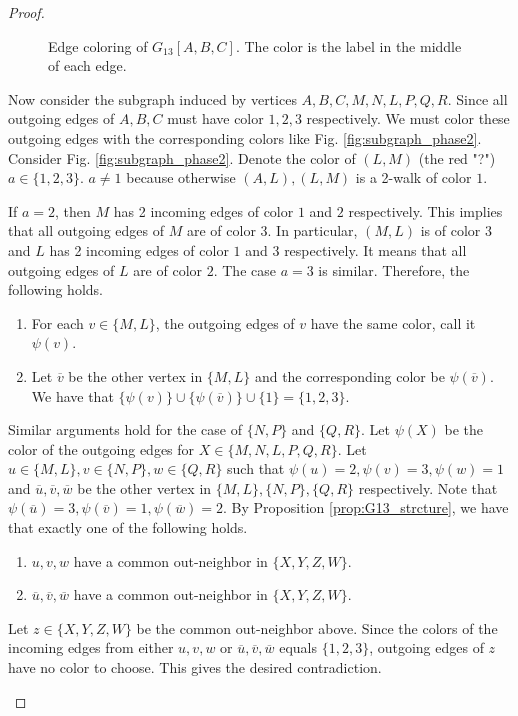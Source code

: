 \documentclass[journal, onecolumn, draftcls]{IEEEtran}
\theoremstyle{definition}
\newcommand{\aditya}[1]{\marginpar{+}{\bf Aditya's remark}: {\em #1}}
\begin{document}
\begin{proof}
\begin{figure}[t]
{
    }
    \caption{Edge coloring of $G_{13}[A,B,C]$. The color is the label in the middle of each edge.}
    \label{fig:coloring_ABC}
\end{figure} 
Now consider the subgraph induced by vertices $A,B,C,M,N,L,P,Q,R$. Since all outgoing edges of $A,B,C$ must have color $1,2,3$ respectively. We must color these outgoing edges with the corresponding colors like Fig. \ref{fig:subgraph_phase2}. Consider Fig. \ref{fig:subgraph_phase2}. Denote the color of  $(L,M)$ (the red "?") $a\in \{1,2,3\}$. $a\ne 1$ because otherwise $(A,L),(L,M)$ is a 2-walk of color $1$. 

If $a=2$, then $M$ has 2 incoming edges of color $1$ and $2$ respectively. This implies that all outgoing edges of $M$ are of color $3$. In particular, $(M,L)$ is of color $3$ and $L$ has 2 incoming edges of color $1$ and $3$ respectively. It means that all outgoing edges of $L$ are of color $2$. The case $a=3$ is similar. Therefore, the following holds. %
\begin{enumerate}
    \item For each $v\in \{M,L\}$, the outgoing edges of $v$ have the same color, call it $\psi(v)$.
    \item Let $\overline{v}$ be the other vertex in $\{M,L\}$ and the corresponding color be $\psi(\overline{v})$. We have that $\{\psi(v)\}\cup \{\psi(\overline{v})\}\cup\{1\}= \{1,2,3\}$.
\end{enumerate} 
Similar arguments hold for the case of $\{N,P\}$ and $\{Q,R\}$. Let $\psi(X)$ be the color of the outgoing edges for $X\in \{M,N,L,P,Q,R\}$.  Let $u\in \{M,L\},v\in\{N,P\},w\in\{Q,R\}$ such that $\psi(u) = 2, \psi(v)=3,\psi(w)=1$ and $\overline{u},\overline{v},\overline{w}$ be the other vertex in $ \{M,L\},\{N,P\} ,\{Q,R\}$ respectively. Note that $\psi(\overline{u}) =3, \psi(\overline{v}) =1, \psi(\overline{w}) =2$. By Proposition \ref{prop:G13_strcture}, we have that exactly one of the following holds.
    \begin{enumerate}
        \item $u,v,w$ have a common out-neighbor in $\{X,Y,Z,W\}$.
        \item $\overline{u},\overline{v},\overline{w}$ have a common out-neighbor in $\{X,Y,Z,W\}$.
    \end{enumerate}  
Let $z\in\{X,Y,Z,W\}$ be the common out-neighbor above. Since the colors of the incoming edges from either $u,v,w$ or $\overline{u},\overline{v},\overline{w}$ equals $\{1,2,3\}$, outgoing edges of $z$ have no color to choose. This gives the desired contradiction.
\begin{figure}[t]
    \centering
    \scalebox{0.55}{%

}
\end{figure}
\end{proof}
\end{document}
